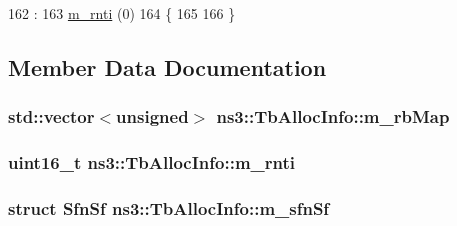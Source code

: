\begin{DoxyCode}
162                        :
163                 \hyperlink{structns3_1_1TbAllocInfo_a837442ee97b561b3e602a41c7fa2eae6}{m\_rnti} (0)
164         \{
165 
166         \}
\end{DoxyCode}


\subsection{Member Data Documentation}
\subsubsection[{\texorpdfstring{m\+\_\+rb\+Map}{m_rbMap}}]{\setlength{\rightskip}{0pt plus 5cm}std\+::vector$<$unsigned$>$ ns3\+::\+Tb\+Alloc\+Info\+::m\+\_\+rb\+Map}\hypertarget{structns3_1_1TbAllocInfo_a5f69b95fc8aacde8fd763db39649c988}{}\label{structns3_1_1TbAllocInfo_a5f69b95fc8aacde8fd763db39649c988}
\subsubsection[{\texorpdfstring{m\+\_\+rnti}{m_rnti}}]{\setlength{\rightskip}{0pt plus 5cm}uint16\+\_\+t ns3\+::\+Tb\+Alloc\+Info\+::m\+\_\+rnti}\hypertarget{structns3_1_1TbAllocInfo_a837442ee97b561b3e602a41c7fa2eae6}{}\label{structns3_1_1TbAllocInfo_a837442ee97b561b3e602a41c7fa2eae6}
\subsubsection[{\texorpdfstring{m\+\_\+sfn\+Sf}{m_sfnSf}}]{\setlength{\rightskip}{0pt plus 5cm}struct {\bf Sfn\+Sf} ns3\+::\+Tb\+Alloc\+Info\+::m\+\_\+sfn\+Sf}\hypertarget{structns3_1_1TbAllocInfo_a74f9476f1d5aef2f5fdbbbcfe1a98b08}{}\label{structns3_1_1TbAllocInfo_a74f9476f1d5aef2f5fdbbbcfe1a98b08}

